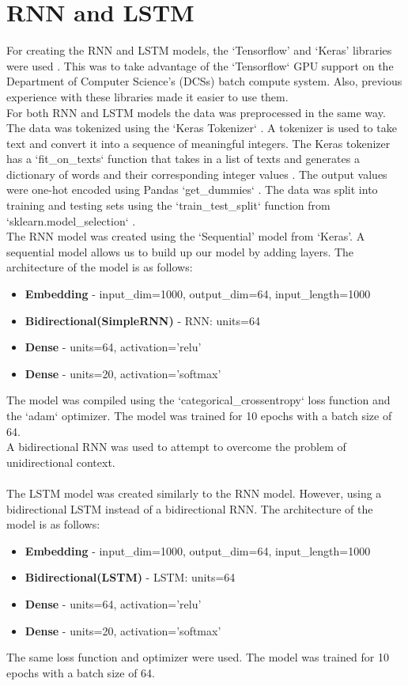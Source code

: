 \section{RNN and LSTM}
For creating the RNN and LSTM models, the `Tensorflow' and `Keras' libraries were used \cite{tensorflow}\cite{keras}. This was to take advantage of the `Tensorflow` GPU support \cite{tensorflow} on
the Department of Computer Science's (DCSs) batch compute system. Also, previous experience with these libraries made it easier to use them.\\
For both RNN and LSTM models the data was preprocessed in the same way. The data was tokenized using the `Keras Tokenizer` \cite{keras-tokenizer}. A tokenizer
is used to take text and convert it into a sequence of meaningful integers. The Keras tokenizer has a `fit\_on\_texts` function that takes in a list of texts and
generates a dictionary of words and their corresponding integer values \cite{tftokenizer}. The output values were one-hot encoded using Pandas `get\_dummies`
\cite{pandas-dummies}. The data was split into training and testing sets using the `train\_test\_split`
function from `sklearn.model\_selection` \cite{sklearn-split}.\\
The RNN model was created using the `Sequential' model from `Keras'. A sequential model allows us to build up our model by adding layers. The architecture of the
model is as follows:
\begin{itemize}
    \item \textbf{Embedding} - input\_dim=1000, output\_dim=64, input\_length=1000
    \item \textbf{Bidirectional(SimpleRNN)} - RNN: units=64
    \item \textbf{Dense} - units=64, activation='relu'
    \item \textbf{Dense} - units=20, activation='softmax'
\end{itemize}
The model was compiled using the `categorical\_crossentropy` loss function and the `adam` optimizer. The model was trained for 10 epochs with a batch size of 64.\\
A bidirectional RNN was used to attempt to overcome the problem of unidirectional context.\\\\
The LSTM model was created similarly to the RNN model. However, using a bidirectional LSTM instead of a bidirectional RNN. The architecture of the model is as follows:
\begin{itemize}
    \item \textbf{Embedding} - input\_dim=1000, output\_dim=64, input\_length=1000
    \item \textbf{Bidirectional(LSTM)} - LSTM: units=64
    \item \textbf{Dense} - units=64, activation='relu'
    \item \textbf{Dense} - units=20, activation='softmax'
\end{itemize}
The same loss function and optimizer were used. The model was trained for 10 epochs with a batch size of 64.
